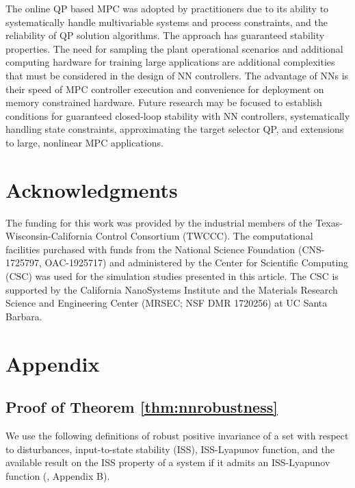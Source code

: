 \documentclass[preprint,5p, twocolumn, authoryear]{elsarticle}
\begin{document}
The online QP based MPC was adopted by practitioners due to its ability to
systematically handle multivariable systems and process constraints, and the
reliability of QP solution algorithms. The approach has guaranteed stability
properties. The need for sampling the plant operational scenarios and additional
computing hardware for training large applications are additional complexities
that must be considered in the design of NN controllers. The advantage of NNs is
their speed of MPC controller execution and convenience for deployment on memory
constrained hardware. Future research may be focused to establish conditions for
guaranteed closed-loop stability with NN controllers, systematically handling
state constraints, approximating the target selector QP, and extensions to
large, nonlinear MPC applications.

\section*{Acknowledgments}
The funding for this work was provided by the industrial members of the
Texas-Wisconsin-California Control Consortium (TWCCC). The computational
facilities purchased with funds from the National Science Foundation
(CNS-1725797, OAC-1925717) and administered by the Center for Scientific
Computing (CSC) was used for the simulation studies presented in this article.
The CSC is supported by the California NanoSystems Institute and the Materials
Research Science and Engineering Center (MRSEC; NSF DMR 1720256) at UC Santa
Barbara.




\section*{Appendix}
\renewcommand{\thesubsection}{\Alph{subsection}}

\subsection{Proof of Theorem \ref{thm:nnrobustness}} \label{app:theorem1}

We use the following definitions of robust positive invariance of a set with
respect to disturbances, input-to-state stability (ISS), ISS-Lyapunov function,
and the available result on the ISS property of a system if it admits an
ISS-Lyapunov function (\cite{jiang:wang:2001, rawlings:mayne:diehl:2017},
Appendix B).
\end{document}
